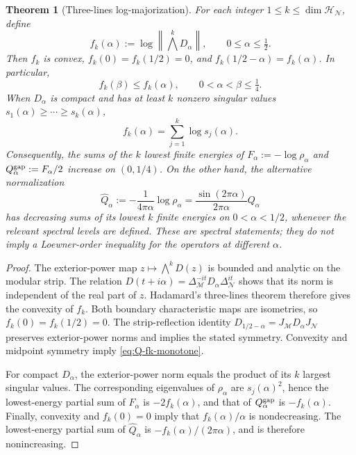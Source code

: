 \documentclass[a4paper,11pt]{article}
\newtheorem{theorem}{Theorem}
\theoremstyle{definition}
\newcommand{\mN}{\mathcal{N}}
\newcommand{\mH}{\mathcal{H}}
\newcommand{\mM}{\mathcal{M}}
\begin{document}
\begin{theorem}[Three-lines log-majorization]
\label{thm:Q-three-lines}
For each integer $1\leq k\leq\dim\mH_{\mN}$, define
\begin{equation}
 f_k(\alpha)
 :=\log\left\|\bigwedge^kD_\alpha\right\|,
 \qquad 0\leq\alpha\leq\tfrac12.
 \label{eq:Q-fk-definition}
\end{equation}
Then $f_k$ is convex, $f_k(0)=f_k(1/2)=0$, and
$f_k(1/2-\alpha)=f_k(\alpha)$. In particular,
\begin{equation}
 \boxed{f_k(\beta)\leq f_k(\alpha),
 \qquad 0<\alpha<\beta\leq\tfrac14.}
 \label{eq:Q-fk-monotone}
\end{equation}
When $D_\alpha$ is compact and has at least $k$ nonzero singular
values $s_1(\alpha)\geq\cdots\geq s_k(\alpha)$,
\begin{equation}
 f_k(\alpha)=\sum_{j=1}^k\log s_j(\alpha).
\end{equation}
Consequently, the sums of the $k$ lowest finite energies of
$F_\alpha:=-\log\rho_\alpha$ and
$Q_\alpha^{\rm gap}:=F_\alpha/2$ increase on $(0,1/4)$.
On the other hand, the alternative normalization
\begin{equation}
 \widehat Q_\alpha:=-\frac{1}{4\pi\alpha}\log\rho_\alpha
 =\frac{\sin(2\pi\alpha)}{2\pi\alpha}Q_\alpha
 \label{eq:Q-alpha-linear-normalization}
\end{equation}
has \emph{decreasing} sums of its lowest $k$ finite energies on
$0<\alpha<1/2$, whenever the relevant spectral levels are defined.
These are spectral statements; they do not imply a Loewner-order
inequality for the operators at different $\alpha$.
\end{theorem}

\begin{proof}
The exterior-power map $z\mapsto\bigwedge^k D(z)$ is bounded
and analytic on the modular strip. The relation
$D(t+i\alpha)=\Delta_\mM^{-it}D_\alpha\Delta_\mN^{it}$
shows that its norm is independent of the real part of $z$.
Hadamard's three-lines theorem \cite{BerghLofstrom1976}
therefore gives the convexity of $f_k$.
Both boundary characteristic maps are isometries, so $f_k(0)=
f_k(1/2)=0$. The strip-reflection identity
$D_{1/2-\alpha}=J_\mM D_\alpha J_\mN$
preserves exterior-power norms and implies the stated symmetry.
Convexity and midpoint symmetry imply \eqref{eq:Q-fk-monotone}.

For compact $D_\alpha$, the exterior-power norm equals the
product of its $k$ largest singular values. The corresponding
eigenvalues of $\rho_\alpha$ are $s_j(\alpha)^2$, hence the
lowest-energy partial sum of $F_\alpha$ is $-2f_k(\alpha)$,
and that of $Q_\alpha^{\rm gap}$ is $-f_k(\alpha)$.
Finally, convexity and $f_k(0)=0$ imply that
$f_k(\alpha)/\alpha$ is nondecreasing. The lowest-energy
partial sum of $\widehat Q_\alpha$ is
$-f_k(\alpha)/(2\pi\alpha)$, and is therefore nonincreasing.
\end{proof}
\end{document}
